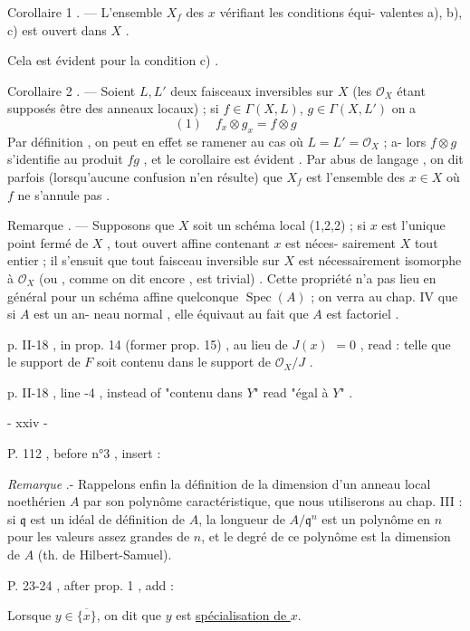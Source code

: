Corollaire 1 . — L'ensemble $X_f$ des $x$ vérifiant les conditions équi-
valentes a), b), c) est ouvert dans $X$ .

Cela est évident pour la condition c) .

Corollaire 2 . — Soient $L, L'$ deux faisceaux inversibles sur $X$ (les $\mathcal{O}_X$
étant supposés être des anneaux locaux) ; si $f \in \Gamma(X, L)$, $g \in \Gamma(X, L')$
on a
$$(1) \quad f_x \otimes g_x = f \otimes g$$
Par définition , on peut en effet se ramener au cas où $L=L'=\mathcal{O}_X$ ; a-
lors $f \otimes g$ s'identifie au produit $fg$ , et le corollaire est évident .
Par abus de langage , on dit parfois (lorsqu'aucune confusion n'en
résulte) que $X_f$ est l'ensemble des $x \in X$ où $f$ ne s'annule pas .

Remarque . — Supposons que $X$ soit un schéma local (1,2,2) ; si $x$ est
l'unique point fermé de $X$ , tout ouvert affine contenant $x$ est néces-
sairement $X$ tout entier ; il s'ensuit que tout faisceau inversible
sur $X$ est nécessairement isomorphe à $\mathcal{O}_X$ (ou , comme on dit encore ,
est trivial) . Cette propriété n'a pas lieu en général pour un schéma
affine quelconque $\operatorname{Spec}(A)$ ; on verra au chap. IV que si $A$ est un an-
neau normal , elle équivaut au fait que $A$ est factoriel .

p. II-18 , in prop. 14 (former prop. 15) , au lieu de $J(x)$
$=0$ , read :
telle que le support de $F$ soit contenu dans le support de $\mathcal{O}_X/J$ .

p. II-18 , line -4 , instead of "contenu dans $Y$" read "égal à $Y$" .

\newpage


- xxiv -

P. 112 , before n°3 , insert :

\emph{Remarque} .- Rappelons enfin la définition de la dimension d'un anneau local noethérien $A$ par son polynôme caractéristique, que nous utiliserons au chap. III : si $\mathfrak{q}$ est un idéal de définition de $A$, la longueur de $A/\mathfrak{q}^n$ est un polynôme en $n$ pour les valeurs assez grandes de $n$, et le degré de ce polynôme est la dimension de $A$ (th. de Hilbert-Samuel).

P. 23-24 , after prop. 1 , add :

Lorsque $y \in \overline{\{x\}}$, on dit que $y$ est \underline{spécialisation de $x$}.

\newpage


